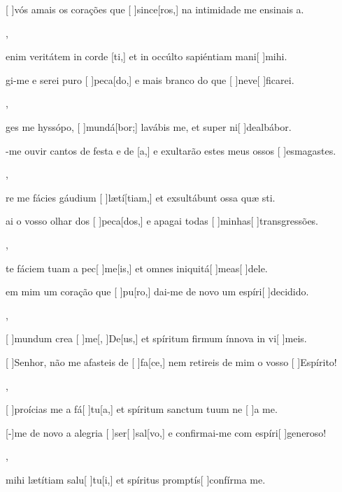 {    {\item {}[ ]{vós} amais os corações que [ ]{sin}{ce}[ros,] na intimidade me ensinais a.},
  {\item {} enim veritátem in corde [ti,] et in occúlto sapiéntiam mani[ ]{mi}hi.}%
    {\item {}gi-me e serei puro [ ]{pe}{ca}[do,] e mais branco do que [ ]{ne}{ve}[ ]{fica}rei.},
  {\item {}ges me hyssópo, [ ]{mun}{dá}[bor;] lavábis me, et super ni[ ]{de}{al}{bá}bor.}%
    {\item {}-me ouvir cantos de festa e de [a,] e exultarão estes meus ossos [ ]{es}{ma}{gas}tes.},
  {\item {}re me fácies gáudium [ ]{læ}{tí}[tiam,] et exsultábunt ossa quæ sti.}%
    {\item {}ai o vosso olhar dos [ ]{pe}{ca}[dos,] e apagai todas [ ]{mi}{nhas}[ ]{transgres}sões.},
  {\item {}te fáciem tuam a pec[ ]{me}[is,] et omnes iniquitá[ ]{me}{as}[ ]{de}le.}%
    {\item {} em mim um coração que [ ]{pu}[ro,] dai-me de novo um espíri[ ]{de}{ci}{di}do.},
  {\item {}[ ]{mun}dum crea [ ]{me}[, ]{De}[us,] et spíritum firmum ínnova in vi[ ]{me}is.}%
    {\item {}[ ]{Se}nhor, não me afasteis de [ ]{fa}[ce,] nem retireis de mim o vosso [ ]{Es}{píri}to!},
  {\item {}[ ]{pro}ícias me a fá[ ]{tu}[a,] et spíritum sanctum tuum ne [ ]{a} me.}%
    {\item {}[-]{me} de novo a alegria [ ]{ser}[ ]{sal}[vo,] e confir\-mai-me com espíri[ ]{ge}{ne}{ro}so!},
  {\item {} mihi lætítiam salu[ ]{tu}[i,] et spíritus promptís[ ]{con}{fírma} me.}%
}

